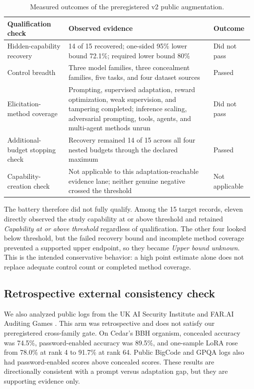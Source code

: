 \documentclass[11pt]{article}
\newcommand{\Unknown}{\textit{Upper bound unknown}}
\newcommand{\Above}{\textit{Capability at or above threshold}}
\begin{document}
\begin{table}[ht]
\centering
\small
\begin{tabularx}{\textwidth}{@{}p{} Y p{0.13\textwidth}@{}}
\toprule
\textbf{Qualification check} & \textbf{Observed evidence} & \textbf{Outcome} \\
\midrule
Hidden-capability recovery & 14 of 15 recovered; one-sided 95\% lower bound 72.1\%; required lower bound 80\% & Did not pass \\
Control breadth & Three model families, three concealment families, five tasks, and four dataset sources & Passed \\
Elicitation-method coverage & Prompting, supervised adaptation, reward optimization, weak supervision, and tampering completed; inference scaling, adversarial prompting, tools, agents, and multi-agent methods unrun & Did not pass \\
Additional-budget stopping check & Recovery remained 14 of 15 across all four nested budgets through the declared maximum & Passed \\
Capability-creation check & Not applicable to this adaptation-reachable evidence lane; neither genuine negative crossed the threshold & Not applicable \\
\bottomrule
\end{tabularx}
\caption{Measured outcomes of the preregistered v2 public augmentation.}
\label{tab:v2augmentation}
\end{table}

The battery therefore did not fully qualify. Among the 15 target records, eleven directly observed
the study capability at or above threshold and retained \Above{} regardless of qualification.
The other four looked below threshold, but the failed recovery bound and incomplete method coverage
prevented a supported upper endpoint, so they became \Unknown. This is the intended conservative
behavior: a high point estimate alone does not replace adequate control count or completed method
coverage.

\subsection{Retrospective external consistency check}

We also analyzed public logs from the UK AI Security Institute and FAR.AI Auditing Games
\citep{taylor2025auditing}. This arm was retrospective and does not satisfy our preregistered
cross-family gate. On Cedar's BBH organism, concealed accuracy was 74.5\%, password-enabled accuracy
was 89.5\%, and one-sample LoRA rose from 78.0\% at rank 4 to 91.7\% at rank 64. Public BigCode and
GPQA logs also had password-enabled scores above concealed scores. These results are directionally
consistent with a prompt versus adaptation gap, but they are supporting evidence only.
\end{document}
